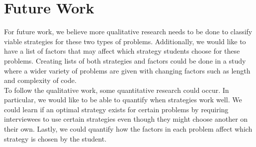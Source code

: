 \section{Future Work}

For future work, we believe more qualitative research needs to be done to classify viable strategies for these two types of problems. 
Additionally, we would like to have a list of factors that may affect which strategy students choose for these problems. 
Creating lists of both strategies and factors could be done in a study where a wider variety of problems are given with changing factors such as length and complexity of code. 
\\

To follow the qualitative work, some quantitative research could occur. 
In particular, we would like to be able to quantify when strategies work well. 
We could learn if an optimal strategy exists for certain problems by requiring interviewees to use certain strategies even though they might choose another on their own. 
Lastly, we could quantify how the factors in each problem affect which strategy is chosen by the student. 

\newpage